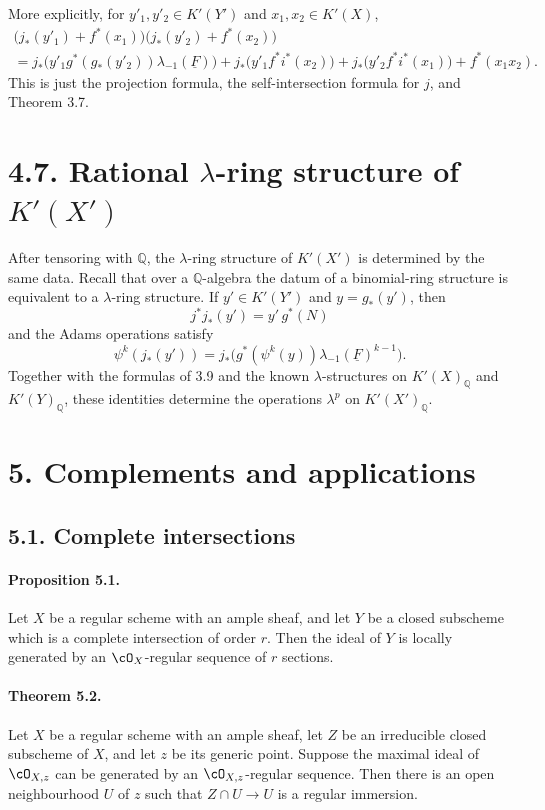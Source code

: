 \documentclass[11pt]{article}
\theoremstyle{plain}
\theoremstyle{definition}
\theoremstyle{remark}
\newcommand{\QQ}{\mathbb Q}
\providecommand{\uF}{\underline{F}}
\begin{document}
More explicitly, for $y'_1,y'_2\in K'(Y')$ and $x_1,x_2\in K'(X)$,
\begin{multline*}
\bigl(j_*(y'_1)+f^*(x_1)\bigr)\bigl(j_*(y'_2)+f^*(x_2)\bigr)\\
= j_*\bigl(y'_1g^*(g_*(y'_2))\lambda_{-1}(\uF)\bigr)
+j_*\bigl(y'_1f^*i^*(x_2)\bigr)+j_*\bigl(y'_2f^*i^*(x_1)\bigr)+f^*(x_1x_2).
\end{multline*}
This is just the projection formula, the self-intersection formula for $j$, and Theorem 3.7.

\section*{4.7. Rational $\lambda$-ring structure of $K'(X')$}

After tensoring with $\QQ$, the $\lambda$-ring structure of $K'(X')$ is determined by the same data. Recall that over a $\QQ$-algebra the datum of a binomial-ring structure is equivalent to a $\lambda$-ring structure. If $y'\in K'(Y')$ and $y=g_*(y')$, then
\[
j^*j_*(y')=y'\,g^*(N)
\]
and the Adams operations satisfy
\[
\psi^k(j_*(y'))=j_*\bigl(g^*(\psi^k(y))\lambda_{-1}(\uF)^{k-1}\bigr).
\]
Together with the formulas of 3.9 and the known $\lambda$-structures on $K'(X)_\QQ$ and $K'(Y)_\QQ$, these identities determine the operations $\lambda^p$ on $K'(X')_\QQ$.

\section*{5. Complements and applications}

\subsection*{5.1. Complete intersections}

\paragraph{Proposition 5.1.} Let $X$ be a regular scheme with an ample sheaf, and let $Y$ be a closed subscheme which is a complete intersection of order $r$. Then the ideal of $Y$ is locally generated by an $\cO_X$-regular sequence of $r$ sections.

\paragraph{Theorem 5.2.} Let $X$ be a regular scheme with an ample sheaf, let $Z$ be an irreducible closed subscheme of $X$, and let $z$ be its generic point. Suppose the maximal ideal of $\cO_{X,z}$ can be generated by an $\cO_{X,z}$-regular sequence. Then there is an open neighbourhood $U$ of $z$ such that $Z\cap U\to U$ is a regular immersion.
\end{document}
